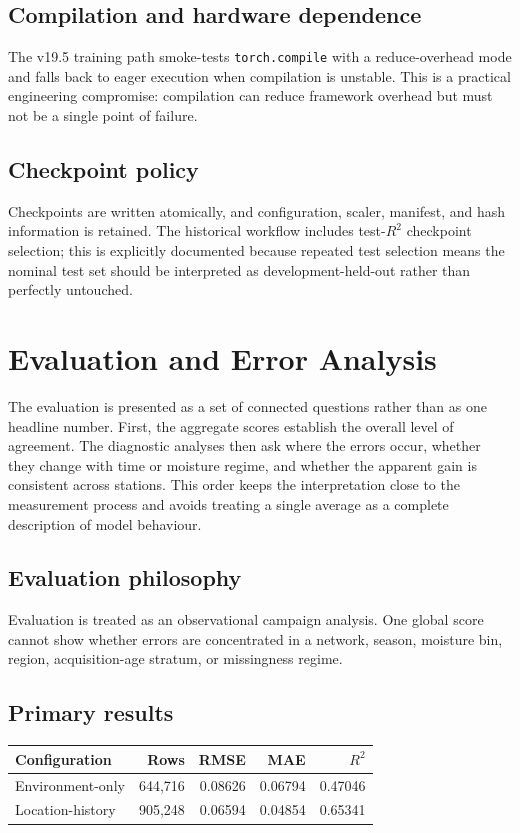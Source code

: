 \documentclass[12pt,a4paper]{report}
\begin{document}
\subsection{Compilation and hardware dependence}
The v19.5 training path smoke-tests \texttt{torch.compile} with a
reduce-overhead mode and falls back to eager execution when compilation is
unstable. This is a practical engineering compromise: compilation can reduce
framework overhead but must not be a single point of failure.

\subsection{Checkpoint policy}
Checkpoints are written atomically, and configuration, scaler, manifest, and
hash information is retained. The historical workflow includes test-$R^2$
checkpoint selection; this is explicitly documented because repeated test
selection means the nominal test set should be interpreted as
development-held-out rather than perfectly untouched.

\section{Evaluation and Error Analysis}

The evaluation is presented as a set of connected questions rather than as one
headline number. First, the aggregate scores establish the overall level of
agreement. The diagnostic analyses then ask where the errors occur, whether
they change with time or moisture regime, and whether the apparent gain is
consistent across stations. This order keeps the interpretation close to the
measurement process and avoids treating a single average as a complete
description of model behaviour.

\subsection{Evaluation philosophy}
Evaluation is treated as an observational campaign analysis. One global score
cannot show whether errors are concentrated in a network, season, moisture bin,
region, acquisition-age stratum, or missingness regime.

\subsection{Primary results}
\begin{center}
\begin{tabular}{lrrrr}
\toprule
Configuration & Rows & RMSE & MAE & $R^2$\\
\midrule
Environment-only & 644,716 & 0.08626 & 0.06794 & 0.47046\\
Location-history & 905,248 & 0.06594 & 0.04854 & 0.65341\\
\bottomrule
\end{tabular}
\end{center}
\end{document}
